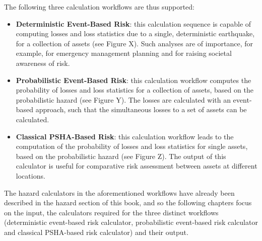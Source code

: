 The following three calculation workflows are thus supported:
\begin{itemize}
\item \textbf{Deterministic Event-Based Risk}: this calculation sequence is capable of computing losses and loss statistics due to a single,
deterministic earthquake, for a collection of assets (see Figure X). Such analyses are of importance, for example, for emergency management planning and for raising societal awareness of risk. 
\item \textbf{Probabilistic Event-Based Risk}: this calculation workflow computes the probability of losses and loss statistics for a collection of
assets, based on the probabilistic hazard (see Figure Y). The losses are calculated with an event-based approach, such that the simultaneous losses to a set of assets can be calculated.
\item \textbf{Classical PSHA-Based Risk}: this calculation workflow leads to the computation of the probability of losses and loss statistics for
single assets, based on the probabilistic hazard (see Figure Z). The output of this calculator is useful for comparative risk assessment between assets at different locations.
\end{itemize}




The hazard calculators in the aforementioned workflows have already been described in the hazard section of this book, and so the following chapters focus on the input, the calculators required for the three distinct workflows (deterministic event-based risk calculator, probabilistic event-based risk calculator and classical PSHA-based risk calculator) and their output.
%